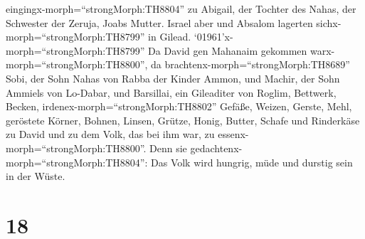 eingingx-morph=``strongMorph:TH8804'' zu Abigail, der Tochter des Nahas,
der Schwester der Zeruja, Joabs Mutter.  Israel aber und
Absalom lagerten sichx-morph=``strongMorph:TH8799'' in Gilead.
 `01961'\textbar x-morph=``strongMorph:TH8799'' Da David
gen Mahanaim gekommen warx-morph=``strongMorph:TH8800'', da
brachtenx-morph=``strongMorph:TH8689'' Sobi, der Sohn Nahas von Rabba
der Kinder Ammon, und Machir, der Sohn Ammiels von Lo-Dabar, und
Barsillai, ein Gileaditer von Roglim,  Bettwerk, Becken,
irdenex-morph=``strongMorph:TH8802'' Gefäße, Weizen, Gerste, Mehl,
geröstete Körner, Bohnen, Linsen, Grütze,  Honig, Butter,
Schafe und Rinderkäse zu David und zu dem Volk, das bei ihm war, zu
essenx-morph=``strongMorph:TH8800''. Denn sie
gedachtenx-morph=``strongMorph:TH8804'': Das Volk wird hungrig, müde und
durstig sein in der Wüste.

\hypertarget{section-17}{%
\section{18}\label{section-17}}

